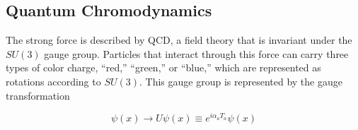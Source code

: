 







\subsection{Quantum Chromodynamics}
\label{sec:QuantumChromo}

The strong force is described by QCD, a field theory that is invariant under the $SU(3)$ gauge group. Particles that interact through this force can carry three types of color charge, ``red,'' ``green,'' or ``blue,'' which are represented as rotations according to $SU(3)$. This gauge group is represented by the gauge transformation

\begin{equation}
\psi(x)\rightarrow U\psi(x)\equiv e^{i\alpha_{a}T_{a}}\psi(x)
\end{equation}


